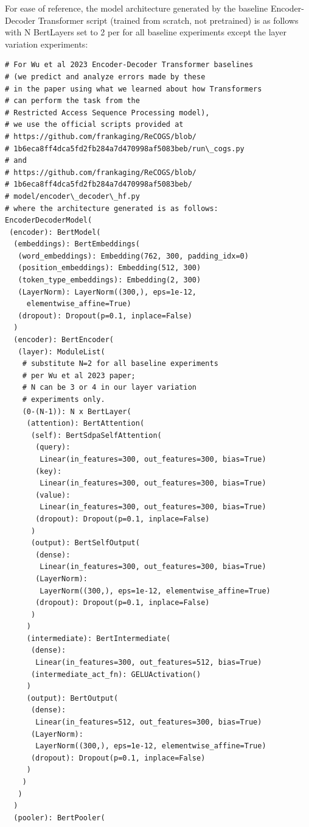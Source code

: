 \documentclass[11pt]{article}
\begin{document}
For ease of reference, the model architecture generated by the \cite{Wu2023} baseline Encoder-Decoder Transformer script (trained from scratch, not pretrained) is as follows with N BertLayers set to 2 per \cite{Wu2023} for all baseline experiments except the layer variation experiments:
\begin{tiny}
\begin{verbatim}
# For Wu et al 2023 Encoder-Decoder Transformer baselines 
# (we predict and analyze errors made by these 
# in the paper using what we learned about how Transformers 
# can perform the task from the 
# Restricted Access Sequence Processing model),
# we use the official scripts provided at 
# https://github.com/frankaging/ReCOGS/blob/
# 1b6eca8ff4dca5fd2fb284a7d470998af5083beb/run\_cogs.py
# and 
# https://github.com/frankaging/ReCOGS/blob/
# 1b6eca8ff4dca5fd2fb284a7d470998af5083beb/
# model/encoder\_decoder\_hf.py
# where the architecture generated is as follows:
EncoderDecoderModel(
 (encoder): BertModel(
  (embeddings): BertEmbeddings(
   (word_embeddings): Embedding(762, 300, padding_idx=0)
   (position_embeddings): Embedding(512, 300)
   (token_type_embeddings): Embedding(2, 300)
   (LayerNorm): LayerNorm((300,), eps=1e-12, 
     elementwise_affine=True)
   (dropout): Dropout(p=0.1, inplace=False)
  )
  (encoder): BertEncoder(
   (layer): ModuleList(
    # substitute N=2 for all baseline experiments
    # per Wu et al 2023 paper; 
    # N can be 3 or 4 in our layer variation 
    # experiments only.
    (0-(N-1)): N x BertLayer(
     (attention): BertAttention(
      (self): BertSdpaSelfAttention(
       (query): 
        Linear(in_features=300, out_features=300, bias=True)
       (key): 
        Linear(in_features=300, out_features=300, bias=True)
       (value): 
        Linear(in_features=300, out_features=300, bias=True)
       (dropout): Dropout(p=0.1, inplace=False)
      )
      (output): BertSelfOutput(
       (dense): 
        Linear(in_features=300, out_features=300, bias=True)
       (LayerNorm): 
        LayerNorm((300,), eps=1e-12, elementwise_affine=True)
       (dropout): Dropout(p=0.1, inplace=False)
      )
     )
     (intermediate): BertIntermediate(
      (dense): 
       Linear(in_features=300, out_features=512, bias=True)
      (intermediate_act_fn): GELUActivation()
     )
     (output): BertOutput(
      (dense): 
       Linear(in_features=512, out_features=300, bias=True)
      (LayerNorm): 
       LayerNorm((300,), eps=1e-12, elementwise_affine=True)
      (dropout): Dropout(p=0.1, inplace=False)
     )
    )
   )
  )
  (pooler): BertPooler(

\end{verbatim}
\end{tiny}
\end{document}
